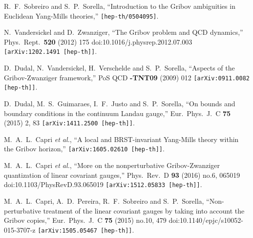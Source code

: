 \documentclass[a4paper,11pt,british,twosides]{book}%
\numberwithin{equation}{section}
\begin{document}
\begin{thebibliography}{9}
  R.~F.~Sobreiro and S.~P.~Sorella,
  ``Introduction to the Gribov ambiguities in Euclidean Yang-Mills theories,''
  {\tt [hep-th/0504095]}.


  N.~Vandersickel and D.~Zwanziger,
  ``The Gribov problem and QCD dynamics,''
  Phys.\ Rept.\  {\bf 520} (2012) 175
  doi:10.1016/j.physrep.2012.07.003
  {\tt [arXiv:1202.1491 [hep-th]]}.

  D.~Dudal, N.~Vandersickel, H.~Verschelde and S.~P.~Sorella,
  ``Aspects of the Gribov-Zwanziger framework,''
  PoS QCD {\bf -TNT09} (2009) 012
  {\tt [arXiv:0911.0082 [hep-th]]}.

  D.~Dudal, M.~S.~Guimaraes, I.~F.~Justo and S.~P.~Sorella,
  ``On bounds and boundary conditions in the continuum Landau gauge,''
  Eur.\ Phys.\ J.\ C {\bf 75} (2015) 2,  83
  {\tt [arXiv:1411.2500 [hep-th]]}.

  M.~A.~L.~Capri {\it et al.},
  ``A local and BRST-invariant Yang-Mills theory within the Gribov horizon,''
  {\tt [arXiv:1605.02610 [hep-th]]}.

  M.~A.~L.~Capri {\it et al.},
  ``More on the nonperturbative Gribov-Zwanziger quantization of linear covariant gauges,''
  Phys.\ Rev.\ D {\bf 93} (2016) no.6,  065019
  doi:10.1103/PhysRevD.93.065019
  {\tt [arXiv:1512.05833 [hep-th]]}.

  M.~A.~L.~Capri, A.~D.~Pereira, R.~F.~Sobreiro and S.~P.~Sorella,
  ``Non-perturbative treatment of the linear covariant gauges by taking into account the Gribov
  copies,''
  Eur.\ Phys.\ J.\ C {\bf 75} (2015) no.10,  479
  doi:10.1140/epjc/s10052-015-3707-z
  {\tt [arXiv:1505.05467 [hep-th]]}.


\end{thebibliography}
\end{document}
